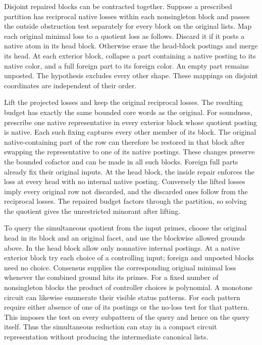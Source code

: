 Disjoint repaired blocks can be contracted together.
Suppose a prescribed partition has reciprocal native
losses within each nonsingleton block and passes the
outside obstruction test separately for every block
on the original lists. Map each original minimal
loss to a quotient loss as follows. Discard it if
it posts a native atom in its head block. Otherwise
erase the head-block postings and merge its head.
At each exterior block, collapse a part containing
a native posting to its native color, and a full
foreign part to its foreign color. An empty part
remains unposted. The hypothesis excludes every
other shape. These mappings on disjoint coordinates
are independent of their order.

Lift the projected losses and keep the original
reciprocal losses. The resulting budget has exactly
the same bounded core words as the original. For
soundness, prescribe one native representative in
every exterior block whose quotient posting is
native. Each such fixing captures every other
member of its block. The original native-containing
part of the row can therefore be restored in that
block after swapping the representative to one of
its native postings. These changes preserve the
bounded cofactor and can be made in all such blocks.
Foreign full parts already fix their original
inputs. At the head block, the inside repair enforces
the loss at every head with no internal native
posting. Conversely the lifted losses imply every
original row not discarded, and the discarded
ones follow from the reciprocal losses. The repaired
budget factors through the partition, so solving
the quotient gives the unrestricted minorant after
lifting.

To query the simultaneous quotient from the input
primes, choose the original head in its block and
an original facet, and use the blockwise allowed
grounds above. In the head block allow only
nonnative internal postings. At a native exterior
block try each choice of a controlling input;
foreign and unposted blocks need no choice.
Consensus supplies the corresponding original
minimal loss whenever the combined ground hits
its primes. For a fixed number of nonsingleton
blocks the product of controller choices is
polynomial. A monotone circuit can likewise
enumerate their visible status patterns. For each
pattern require either absence of one of its
postings or the no-loss test for that pattern.
This imposes the test on every subpattern of the
query and hence on the query itself. Thus the
simultaneous reduction can stay in a compact
circuit representation without producing the
intermediate canonical lists.

